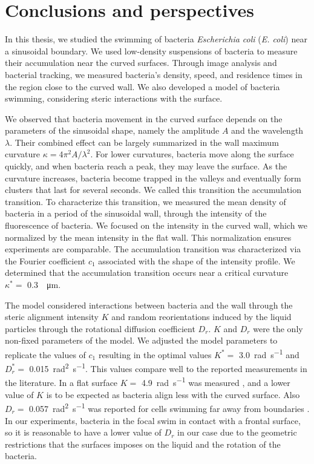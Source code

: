 \chapter{Conclusions and perspectives}

In this thesis, we studied the swimming of bacteria \textit{Escherichia coli} (\textit{E. coli}) near a sinusoidal boundary. We used low-density suspensions of bacteria to measure their accumulation near the curved surfaces. Through image analysis and bacterial tracking, we measured bacteria's density, speed, and residence times in the region close to the curved wall. We also developed a model of bacteria swimming, considering steric interactions with the surface.

We observed that bacteria movement in the curved surface depends on the parameters of the sinusoidal shape, namely the amplitude $A$ and the wavelength $\lambda$. Their combined effect can be largely summarized in the wall maximum curvature $\kappa=4\pi^2 A /  \lambda^2$. For lower curvatures, bacteria move along the surface quickly, and when bacteria reach a peak, they may leave the surface. As the curvature increases, bacteria become trapped in the valleys and eventually form clusters that last for several seconds. We called this transition the accumulation transition. To characterize this transition, we measured the mean density of bacteria in a period of the sinusoidal wall, through the intensity of the fluorescence of bacteria. We focused on the intensity in the curved wall, which we normalized by the mean intensity in the flat wall. This normalization ensures experiments are comparable. The accumulation transition was characterized via the Fourier coefficient $c_1$ associated with the shape of the intensity profile. We determined that the accumulation transition occurs near a critical curvature $\kappa^* =$ \SI{0.3}{\per \micro \meter}. 

The model considered interactions between bacteria and the wall through the steric alignment intensity $K$ and random reorientations induced by the liquid particles through the rotational diffusion coefficient $D_r$. $K$ and $D_r$ were the only non-fixed parameters of the model. We adjusted the model parameters to replicate the values of $c_1$ resulting in the optimal values $K^*=$ \SI[per-mode = symbol]{3.0}{\radian\per\second} and $D_r^*=$ \SI[per-mode = symbol]{0.015}{\square\radian\per\second}. This values compare well to the reported measurements in the literature. In a flat surface $K=$ \SI[per-mode = symbol]{4.9}{\radian\per\second} was measured \cite{Bianchi20193DInterface}, and a lower value of $K$ is to be expected as bacteria align less with the curved surface. Also $D_r=$ \SI[per-mode = symbol]{0.057}{\square\radian\per\second} was reported for cells swimming far away from boundaries \cite{Drescher2011FluidScattering}. In our experiments, bacteria in the focal swim in contact with a frontal surface, so it is reasonable to have a lower value of $D_r$ in our case due to the geometric restrictions that the surfaces imposes on the liquid and the rotation of the bacteria. 


